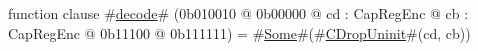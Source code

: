 function clause #\hyperref[zdecode]{decode}# (0b010010 @ 0b00000 @ cd : CapRegEnc @ cb : CapRegEnc @    0b11100 @ 0b111111) = #\hyperref[zSome]{Some}#(#\hyperref[zCDropUninit]{CDropUninit}#(cd, cb))
